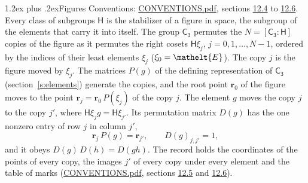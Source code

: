 \documentclass[10pt,a4paper]{article}
\makeatletter
\renewcommand\section{\@startsection{section}{1}{\z@}{-3ex plus -1ex minus -.2ex}%
  {1.2ex plus .2ex}{\normalfont\large\sffamily\bfseries\color{parttitle}}}
\numberwithin{equation}{section}
\newcommand{\eltfont}[1]{{\let\sigma\eltsigma\mathelt{#1}}}
\newcommand{\grp}[1]{\mathsf{#1}}
\newcommand{\cls}[1]{\eltfont{#1}}
\newcommand{\pointr}{\mathbf{r}}
\makeatother
\begin{document}
\section{Figures}\label{s:permutation}
Conventions: \href{../../CONVENTIONS.pdf}{CONVENTIONS.pdf}, sections \href{../../CONVENTIONS.pdf\#conv.12.4}{12.4} to \href{../../CONVENTIONS.pdf\#conv.12.6}{12.6}.
Every class of subgroups $\grp{H}$ is the stabilizer of a figure in space, the subgroup of the elements that carry it into itself. \label{n:local.orbit.size}\label{n:element.coset.least}\label{n:index.coset}The group $\grp{C_{3}}$ permutes the $N = [\grp{C_{3}} : \grp{H}]$ copies of the figure as it permutes the right cosets $\grp{H}\xi_j$, $j = 0, 1, \dots, N - 1$, ordered by the indices of their least elements $\xi_j$ ($\xi_0 = \cls{E}$). The copy $j$ is the figure moved by $\xi_j$. The matrices $P(g)$ of the defining representation of $\grp{C_{3}}$ (section~\ref{s:elements}) generate the copies, and the root point $\pointr_0$ of the figure moves to the point $\pointr_j = \pointr_0\, P(\xi_j)$ of the copy $j$. \label{n:local.coset.image}The element $g$ moves the copy $j$ to the copy $j'$, where $\grp{H}\xi_j g = \grp{H}\xi_{j'}$. \label{n:local.matrix.permutation}Its permutation matrix $D(g)$ has the one nonzero entry of row $j$ in column $j'$,
\begin{equation}\label{e:perm.matrix}\pointr_j\, P(g) = \pointr_{j'}, \qquad D(g)_{j,j'} = 1,\end{equation}
and it obeys $D(g)\, D(h) = D(gh)$. The record holds the coordinates of the points of every copy, the images $j'$ of every copy under every element and the table of marks (\href{../../CONVENTIONS.pdf}{CONVENTIONS.pdf}, sections \href{../../CONVENTIONS.pdf\#conv.12.5}{12.5} and \href{../../CONVENTIONS.pdf\#conv.12.6}{12.6}).
\end{document}
